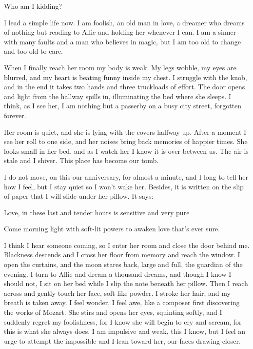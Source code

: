 \documentclass[10pt, twoside, openright]{book}
\begin{document}
Who am I kidding?


I lead a simple life now. I am foolish, an old man in love, a dreamer
who dreams of nothing but reading to Allie and holding her whenever I
can. I am a sinner with many faults and a man who believes in magic, but
I am too old to change and too old to care.

When I finally reach her room my body is weak. My legs wobble, my eyes
are blurred, and my heart is beating funny inside my chest. I struggle
with the knob, and in the end it takes two hands and three truckloads of
effort. The door opens and light from the hallway spills in,
illuminating the bed where she sleeps. I think, as I see her, I am
nothing but a passerby on a busy city street, forgotten forever.

Her room is quiet, and she is lying with the covers halfway up. After a
moment I see her roll to one side, and her noises bring back memories of
happier times. She looks small in her bed, and as I watch her I know it
is over between us. The air is stale and I shiver. This place has become
our tomb.

I do not move, on this our anniversary, for almost a minute, and I long
to tell her how I feel, but I stay quiet so I won't wake her. Besides,
it is written on the slip of paper that I will slide under her pillow.
It says:


Love, in these last and tender hours is sensitive and very pure

Come morning light with soft-lit powers to awaken love that's ever sure.


I think I hear someone coming, so I enter her room and close the door
behind me. Blackness descends and I cross her floor from memory and
reach the window. I open the curtains, and the moon stares back, large
and full, the guardian of the evening. I turn to Allie and dream a
thousand dreams, and though I know I should not, I sit on her bed while
I slip the note beneath her pillow. Then I reach across and gently touch
her face, soft like powder. I stroke her hair, and my breath is taken
away. I feel wonder, I feel awe, like a composer first discovering the
works of Mozart. She stirs and opens her eyes, squinting softly, and I
suddenly regret my foolishness, for I know she will begin to cry and
scream, for this is what she always does. I am impulsive and weak, this
I know, but I feel an urge to attempt the impossible and I lean toward
her, our faces drawing closer.
\end{document}
